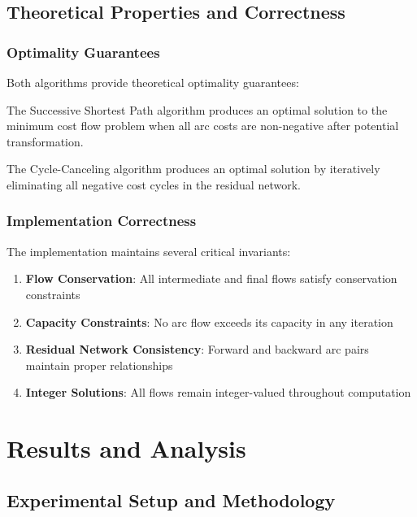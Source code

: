\documentclass[12pt,a4paper]{article}
\begin{document}
\subsection{Theoretical Properties and Correctness}

\subsubsection{Optimality Guarantees}

Both algorithms provide theoretical optimality guarantees:

\begin{theorem}
The Successive Shortest Path algorithm produces an optimal solution to the minimum cost flow problem when all arc costs are non-negative after potential transformation.
\end{theorem}

\begin{theorem}
The Cycle-Canceling algorithm produces an optimal solution by iteratively eliminating all negative cost cycles in the residual network.
\end{theorem}

\subsubsection{Implementation Correctness}

The implementation maintains several critical invariants:

\begin{enumerate}
\item \textbf{Flow Conservation}: All intermediate and final flows satisfy conservation constraints
\item \textbf{Capacity Constraints}: No arc flow exceeds its capacity in any iteration
\item \textbf{Residual Network Consistency}: Forward and backward arc pairs maintain proper relationships
\item \textbf{Integer Solutions}: All flows remain integer-valued throughout computation
\end{enumerate}

\section{Results and Analysis}

\subsection{Experimental Setup and Methodology}
\end{document}

